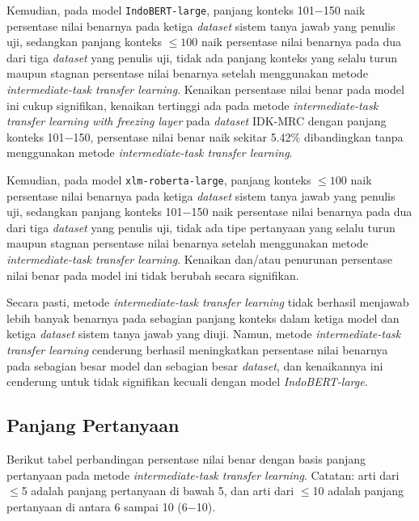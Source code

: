 Kemudian, pada model \texttt{IndoBERT-large}, panjang konteks 101$-$150 naik persentase nilai benarnya pada ketiga \emph{dataset} sistem tanya jawab yang penulis uji, sedangkan panjang konteks $\leq100$ naik persentase nilai benarnya pada dua dari tiga \emph{dataset} yang penulis uji, tidak ada panjang konteks yang selalu turun maupun stagnan persentase nilai benarnya setelah menggunakan metode \emph{intermediate-task transfer learning}. Kenaikan persentase nilai benar pada model ini cukup signifikan, kenaikan tertinggi ada pada metode \emph{intermediate-task transfer learning with freezing layer} pada \emph{dataset} IDK-MRC dengan panjang konteks 101$-$150, persentase nilai benar naik sekitar 5.42\% dibandingkan tanpa menggunakan metode \emph{intermediate-task transfer learning}.

Kemudian, pada model \texttt{xlm-roberta-large}, panjang konteks $\leq100$ naik persentase nilai benarnya pada ketiga \emph{dataset} sistem tanya jawab yang penulis uji, sedangkan panjang konteks 101$-$150 naik persentase nilai benarnya pada dua dari tiga \emph{dataset} yang penulis uji, tidak ada tipe pertanyaan yang selalu turun maupun stagnan persentase nilai benarnya setelah menggunakan metode \emph{intermediate-task transfer learning}. Kenaikan dan/atau penurunan persentase nilai benar pada model ini tidak berubah secara signifikan.

Secara pasti, metode \emph{intermediate-task transfer learning} tidak berhasil menjawab lebih banyak benarnya pada sebagian panjang konteks dalam ketiga model dan ketiga \emph{dataset} sistem tanya jawab yang diuji. Namun, metode \emph{intermediate-task transfer learning} cenderung berhasil meningkatkan persentase nilai benarnya pada sebagian besar model dan sebagian besar \emph{dataset}, dan kenaikannya ini cenderung untuk tidak signifikan kecuali dengan model \emph{IndoBERT-large}.

\subsection{Panjang Pertanyaan}
Berikut tabel perbandingan persentase nilai benar dengan basis panjang pertanyaan pada metode \emph{intermediate-task transfer learning}. Catatan: arti dari $\leq$5 adalah panjang pertanyaan di bawah 5, dan arti dari $\leq$10 adalah panjang pertanyaan di antara 6 sampai 10 (6$-$10).

